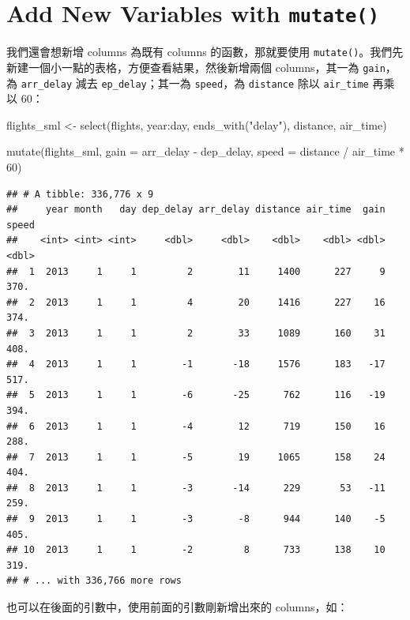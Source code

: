 \documentclass[
]{book}
\newenvironment{Shaded}{\begin{snugshade}}{\end{snugshade}}
\newcommand{\AttributeTok}[1]{\textcolor[rgb]{0.77,0.63,0.00}{#1}}
\newcommand{\DecValTok}[1]{\textcolor[rgb]{0.00,0.00,0.81}{#1}}
\newcommand{\FunctionTok}[1]{\textcolor[rgb]{0.00,0.00,0.00}{#1}}
\newcommand{\NormalTok}[1]{#1}
\newcommand{\OtherTok}[1]{\textcolor[rgb]{0.56,0.35,0.01}{#1}}
\newcommand{\SpecialCharTok}[1]{\textcolor[rgb]{0.00,0.00,0.00}{#1}}
\newcommand{\StringTok}[1]{\textcolor[rgb]{0.31,0.60,0.02}{#1}}
\theoremstyle{definition}
\theoremstyle{remark}
\begin{document}
\hypertarget{mutate}{%
\section{\texorpdfstring{Add New Variables with \texttt{mutate()}}{Add New Variables with mutate()}}\label{mutate}}

我們還會想新增 columns 為既有 columns 的函數，那就要使用 \texttt{mutate()}。我們先新建一個小一點的表格，方便查看結果，然後新增兩個 columns，其一為 \texttt{gain}，為 \texttt{arr\_delay} 減去 \texttt{ep\_delay}；其一為 \texttt{speed}，為 \texttt{distance} 除以 \texttt{air\_time} 再乘以 60：

\begin{Shaded}
\begin{Highlighting}[]
\NormalTok{flights\_sml }\OtherTok{\textless{}{-}} \FunctionTok{select}\NormalTok{(flights, year}\SpecialCharTok{:}\NormalTok{day, }\FunctionTok{ends\_with}\NormalTok{(}\StringTok{"delay"}\NormalTok{), distance, air\_time)}

\FunctionTok{mutate}\NormalTok{(flights\_sml,}
       \AttributeTok{gain =}\NormalTok{ arr\_delay }\SpecialCharTok{{-}}\NormalTok{ dep\_delay,}
       \AttributeTok{speed =}\NormalTok{ distance }\SpecialCharTok{/}\NormalTok{ air\_time }\SpecialCharTok{*} \DecValTok{60}\NormalTok{)}
\end{Highlighting}
\end{Shaded}

\begin{verbatim}
## # A tibble: 336,776 x 9
##     year month   day dep_delay arr_delay distance air_time  gain speed
##    <int> <int> <int>     <dbl>     <dbl>    <dbl>    <dbl> <dbl> <dbl>
##  1  2013     1     1         2        11     1400      227     9  370.
##  2  2013     1     1         4        20     1416      227    16  374.
##  3  2013     1     1         2        33     1089      160    31  408.
##  4  2013     1     1        -1       -18     1576      183   -17  517.
##  5  2013     1     1        -6       -25      762      116   -19  394.
##  6  2013     1     1        -4        12      719      150    16  288.
##  7  2013     1     1        -5        19     1065      158    24  404.
##  8  2013     1     1        -3       -14      229       53   -11  259.
##  9  2013     1     1        -3        -8      944      140    -5  405.
## 10  2013     1     1        -2         8      733      138    10  319.
## # ... with 336,766 more rows
\end{verbatim}

也可以在後面的引數中，使用前面的引數剛新增出來的 columns，如：
\end{document}
